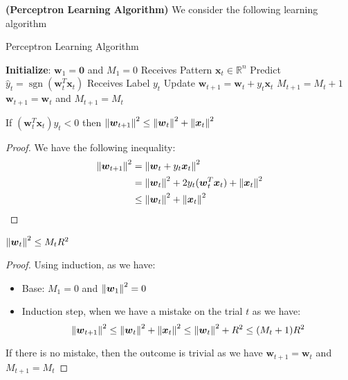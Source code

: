 \begin{definition}{\textbf{(Perceptron Learning Algorithm)}}
    We consider the following learning algorithm 
    \begin{algorithm}[H]
        \caption{Perceptron Learning Algorithm}
        \begin{algorithmic}[1]
            \State \textbf{Initialize}: $\boldsymbol w_1=\boldsymbol 0$ and $M_1=0$ 
                \State Receives Pattern $\boldsymbol x_t \in \mathbb{R}^n$
                \State Predict $\hat{y}_t = \operatorname{sgn}(\boldsymbol w_t^T\boldsymbol x_t)$
                \State Receives Label $y_t$
                    \State Update $\boldsymbol w_{t+1} = \boldsymbol w_t + y_t\boldsymbol x_t$
                    \State $M_{t+1} = M_t + 1$
                \Else
                    \State $\boldsymbol w_{t+1} = \boldsymbol w_t$ and $M_{t+1} = M_t$
                \EndIf
            \EndFor
        \end{algorithmic} 
    \end{algorithm}
\end{definition}

\begin{lemma}
    If $(\boldsymbol w^T_t\boldsymbol x_t)y_t < 0$ then $\left\lVert\boldsymbol w_{t+1}\right\rVert^2 \le \left\lVert\boldsymbol w_t\right\rVert^2 + \left\lVert\boldsymbol x_t\right\rVert^2$
\end{lemma}
\begin{proof}
    We have the following inequality:
    \begin{equation*}
    \begin{aligned}
        \left\lVert\boldsymbol w_{t+1}\right\rVert^2 &= \left\lVert\boldsymbol w_t + y_t\boldsymbol x_t\right\rVert^2 \\
        &= \left\lVert\boldsymbol w_t\right\rVert^2 + 2y_t(\boldsymbol w_t^T\boldsymbol x_t)+\left\lVert\boldsymbol x_t\right\rVert^2 \\
        &\le \left\lVert\boldsymbol w_t\right\rVert^2 + \left\lVert\boldsymbol x_t\right\rVert^2
    \end{aligned}
    \end{equation*}
\end{proof}

\begin{lemma}
    $\left\lVert\boldsymbol w_t\right\rVert^2 \le M_tR^2$
\end{lemma}
\begin{proof}
    Using induction, as we have:
    \begin{itemize}
        \item Base: $M_1 = 0$ and $\left\lVert\boldsymbol w_1\right\rVert^2 = 0$
        \item Induction step, when we have a mistake on the trial $t$ as we have:
        \begin{equation*}
            \left\lVert\boldsymbol w_{t+1}\right\rVert^2 \le \left\lVert\boldsymbol w_t\right\rVert^2 + \left\lVert\boldsymbol x_t\right\rVert^2 \le \left\lVert\boldsymbol w_t\right\rVert^2 + R^2 \le (M_{t}+1)R^2
        \end{equation*}
    \end{itemize}
    If there is no mistake, then the outcome is trivial as we have $\boldsymbol w_{t+1} = \boldsymbol w_t$ and $M_{t+1} = M_t$
\end{proof}

